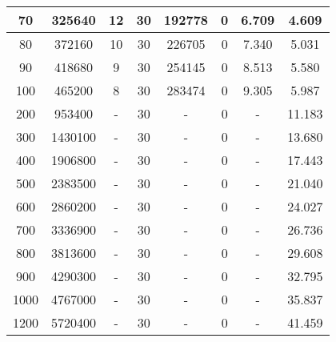 \documentclass{acmsiggraph}
\begin{document}
\begin{table}[h]
\begin{tabular}{|c|c|c|c|c|c|c|c|}
    \hline
                    70 & 325640                 & 12 & 30                  & 192778& 0                                     & 6.709 & 4.609                              \\   
    \hline
                    80 & 372160                 & 10 & 30                  & 226705& 0                                     & 7.340 & 5.031                              \\   
    \hline
                    90 & 418680                 & 9  & 30                  & 254145& 0                                     & 8.513 & 5.580                              \\   
    \hline
                    100& 465200                 & 8  & 30                  & 283474& 0                                     & 9.305 & 5.987                              \\   
    \hline
                    200& 953400                 & -  & 30                  & -     & 0                                     & -     & 11.183                             \\   
    \hline
                    300& 1430100                & -  & 30                  & -     & 0                                     & -     & 13.680                             \\
    \hline
                    400& 1906800                & -  & 30                  & -     & 0                                     & -     & 17.443                             \\
    \hline
                    500& 2383500                & -  & 30                  & -     & 0                                     & -     & 21.040                             \\
    \hline
                    600& 2860200                & -  & 30                  & -     & 0                                     & -     & 24.027                             \\
    \hline
                    700& 3336900                & -  & 30                  & -     & 0                                     & -     & 26.736                             \\
    \hline
                    800& 3813600                & -  & 30                  & -     & 0                                     & -     & 29.608                             \\
    \hline
                    900& 4290300                & -  & 30                  & -     & 0                                     & -     & 32.795                             \\
    \hline
                   1000& 4767000                & -  & 30                  & -     & 0                                     & -     & 35.837                             \\
    \hline
                   1200& 5720400                & -  & 30                  & -     & 0                                     & -     & 41.459                             \\
    \hline    
  \end{tabular}
  \label{performance}
\end{table}
  
\end{document}
